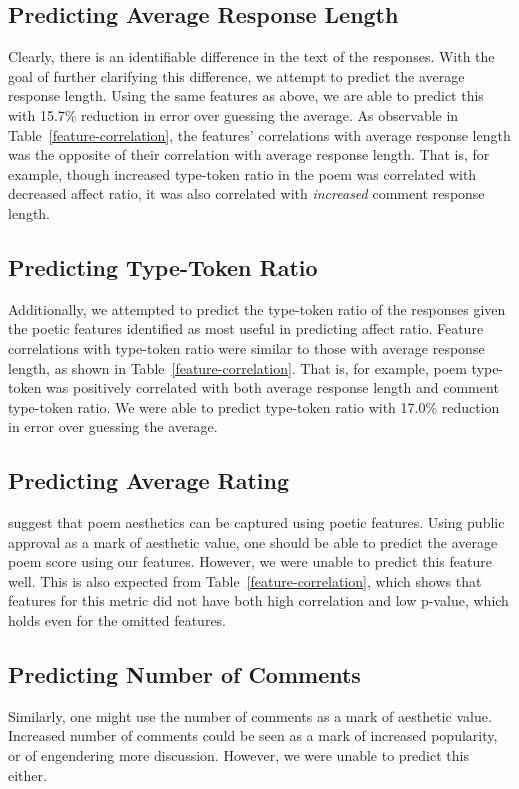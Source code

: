 \documentclass[11pt]{article}
\begin{document}
\subsection{Predicting Average Response Length}
Clearly, there is an identifiable difference in the text of the responses. With the goal of further clarifying this difference, we attempt to predict the average response length. Using the same features as above, we are able to predict this with 15.7\% reduction in error over guessing the average. As observable in Table~\ref{feature-correlation}, the features’ correlations with average response length was the opposite of their correlation with average response length. That is, for example, though increased type-token ratio in the poem was correlated with decreased affect ratio, it was also correlated with \emph{increased} comment response length.

\subsection{Predicting Type-Token Ratio}
Additionally, we attempted to predict the type-token ratio of the responses given the poetic features identified as most useful in predicting affect ratio. Feature correlations with type-token ratio were similar to those with average response length, as shown in Table~\ref{feature-correlation}. That is, for example, poem type-token was positively correlated with both average response length and comment type-token ratio. We were able to predict type-token ratio with 17.0\% reduction in error over guessing the average.

\subsection{Predicting Average Rating}
 suggest that poem aesthetics can be captured using poetic features. Using public approval as a mark of aesthetic value, one should be able to predict the average poem score using our features. However, we were unable to predict this feature well. This is also expected from Table~\ref{feature-correlation}, which shows that features for this metric did not have both high correlation and low p-value, which holds even for the omitted features.

\subsection{Predicting Number of Comments}
Similarly, one might use the number of comments as a mark of aesthetic value. Increased number of comments could be seen as a mark of increased popularity, or of engendering more discussion. However, we were unable to predict this either.
\end{document}
